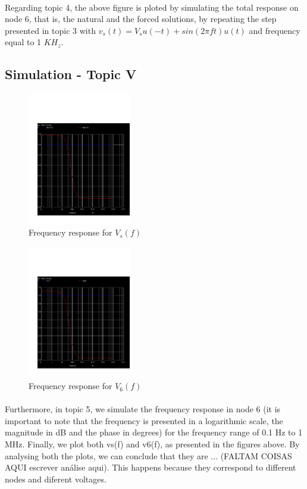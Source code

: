 \paragraph{}
Regarding topic 4, the above figure is ploted by simulating the total response on node 6, that is, the natural and the forced solutions, by repeating the step presented in topic 3 with $v_s(t) = V_s u(-t) + sin(2 \pi ft) u(t)$ and frequency equal to 1 $KH_z$. 


\subsection{Simulation - Topic V}
\label{subsec:sim_fifth}

\begin{figure}[H] \centering
\includegraphics[width=0.4\textwidth]{acm.pdf}
\caption{Frequency response for $V_s(f)$}
\label{fig:$V_s(f)$}
\end{figure}


\begin{figure}[H] \centering
\includegraphics[width=0.4\textwidth]{acp.pdf}
\caption{Frequency response for $V_6(f)$}
\label{fig:$V_6(f)$}
\end{figure}

\paragraph{}
Furthermore, in topic 5, we simulate the frequency response in node 6 (it is important to note that the frequency is presented in a logarithmic scale, the magnitude in dB and the phase in degrees) for the frequency range of 0.1 Hz to 1 MHz. Finally, we plot both vs(f) and v6(f), as presented in the figures above. By analysing both the plots, we can conclude that they are ... (FALTAM COISAS AQUI escrever análise aqui). This happens because they correspond to different nodes and diferent voltages.
